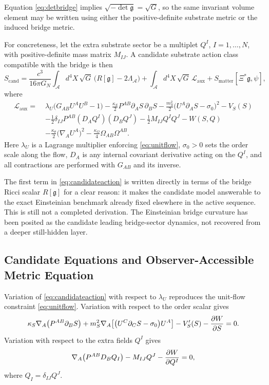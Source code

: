\documentclass[11pt]{article}
\newcommand{\Sub}{\mathcal{A}}
\newcommand{\BridgeMetric}{\mathfrak{g}}
\begin{document}
Equation \eqref{eq:detbridge} implies \(\sqrt{-\det \BridgeMetric}=\sqrt{G}\), so the same invariant volume element may be written using either the positive-definite substrate metric or the induced bridge metric.

For concreteness, let the extra substrate sector be a multiplet \(Q^I\), \(I=1,\dots,N\), with positive-definite mass matrix \(M_{IJ}\). A candidate substrate action class compatible with the bridge is then
\begin{equation}
S_{\mathrm{cand}}
=
\frac{c^3}{16\pi G_N}
\int_{\Sub} d^4X\,\sqrt{G}\,\bigl(R[\BridgeMetric]-2\Lambda_{\Sub}\bigr)
+
\int_{\Sub} d^4X\,\sqrt{G}\,\mathcal{L}_{\mathrm{aux}}
+
S_{\mathrm{matter}}[\Xi^*\BridgeMetric,\psi],
\label{eq:candidateaction}
\end{equation}
where
\begin{align}
\mathcal{L}_{\mathrm{aux}}
=\;&
\lambda_U\bigl(G_{AB}U^A U^B-1\bigr)
-\frac{\kappa_S}{2}P^{AB}\partial_A S\,\partial_B S
-\frac{m_S^2}{2}\bigl(U^A\partial_A S-\sigma_0\bigr)^2
-V_S(S)
\nonumber\\
&-\frac{1}{2}\delta_{IJ}P^{AB}(D_AQ^I)(D_BQ^J)
-\frac{1}{2}M_{IJ}Q^I Q^J
-W(S,Q)
\nonumber\\
&-\frac{\kappa_\theta}{2}\bigl(\nabla_A U^A\bigr)^2
-\frac{\kappa_\Omega}{4}\Omega_{AB}\Omega^{AB}.
\label{eq:auxlag}
\end{align}
Here \(\lambda_U\) is a Lagrange multiplier enforcing \eqref{eq:unitflow}, \(\sigma_0>0\) sets the order scale along the flow, \(D_A\) is any internal covariant derivative acting on the \(Q^I\), and all contractions are performed with \(G_{AB}\) and its inverse.

The first term in \eqref{eq:candidateaction} is written directly in terms of the bridge Ricci scalar \(R[\BridgeMetric]\) for a clear reason: it makes the candidate model answerable to the exact Einsteinian benchmark already fixed elsewhere in the active sequence. This is still not a completed derivation. The Einsteinian bridge curvature has been posited as the candidate leading bridge-sector dynamics, not recovered from a deeper still-hidden layer.

\subsection{Candidate Equations and Observer-Accessible Metric Equation}

Variation of \eqref{eq:candidateaction} with respect to \(\lambda_U\) reproduces the unit-flow constraint \eqref{eq:unitflow}. Variation with respect to the order scalar gives
\begin{equation}
\kappa_S \nabla_A\!\left(P^{AB}\partial_B S\right)
+
m_S^2 \nabla_A\!\left[\bigl(U^C\partial_C S-\sigma_0\bigr)U^A\right]
-V_S'(S)
-\pdv{W}{S}
=
0.
\label{eq:Seom}
\end{equation}
Variation with respect to the extra fields \(Q^I\) gives
\begin{equation}
\nabla_A\!\left(P^{AB}D_B Q_I\right)
-M_{IJ}Q^J
-\pdv{W}{Q^I}
=
0,
\label{eq:Qeom}
\end{equation}
where \(Q_I=\delta_{IJ}Q^J\).
\end{document}
